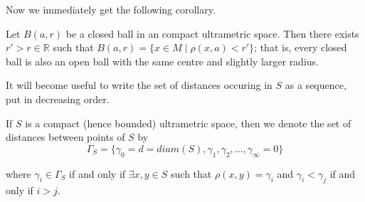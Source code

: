 Now we immediately get the following corollary.\\
\begin{corollary}
\cite{ar} Let $B(a, r)$ be a closed ball in an compact ultrametric space. Then there exists $ r' > r \in \mathbb{R}$ such that $B(a, r) = \{x \in M \mid \rho(x,a) < r'\} $; that is, every closed ball is also an open ball with the same centre and  slightly larger radius.
\end{corollary}

It will become useful to write the set of distances occuring in $S$ as a sequence, put in decreasing order. 

\begin{notation*}
If $S$ is a compact (hence bounded) ultrametric space, then we denote the set of distances between points of $S$ by 
$$\Gamma_S = \{\gamma_0 = d =diam(S), \gamma_1, \gamma_2, \ldots, \gamma_\infty =0 \}$$

where $\gamma_i \in  \Gamma_S$ if and only if $\exists x,y \in S$ such that $\rho(x,y) = \gamma_i$ and  $\gamma_i < \gamma_j$ if and only if $i > j$. 
\end{notation*}








